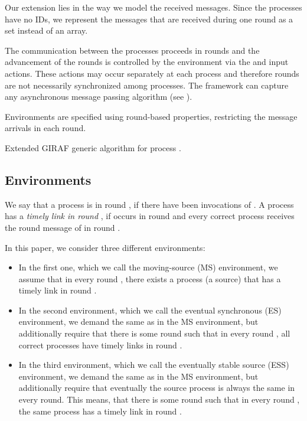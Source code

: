 \documentclass[conference, compsoc]{IEEEtran}
\begin{document}
Our extension lies in the way we model the received messages. Since the processes have no IDs, we represent the messages that are received during one round as a set instead of an array.

The communication between the processes proceeds in rounds and the advancement of the rounds is controlled by the environment via the  and  input actions. These actions may occur separately at each process  and therefore rounds are not necessarily synchronized among processes. The framework can capture any asynchronous message passing algorithm (see \cite{1449454}). 

Environments are specified using round-based properties, restricting the message arrivals in each round. 

\begin{algorithm}[htb] 
  {\small \SetVline   
	       
		

\caption{Extended GIRAF generic algorithm for process .}
\label{alg:eGIRAF}
}
\end{algorithm} 


\subsection{Environments}

We say that a process  is in round , if there have been  invocations of . A process  has a \emph{timely link in round }, if  occurs in round  and every correct process  receives the round  message of  in round . 

In this paper, we consider three different environments: 
\begin{itemize}
 \item In the first one, which we call the moving-source (MS) environment, we assume that in every round , there exists a process  (a source) that has a timely link in round .

 \item In the second environment, which we call the eventual synchronous (ES) environment, we demand the same as in the MS environment, but additionally require that there is some round  such that in every round , all correct processes have timely links in round .
  
 \item In the third environment, which we call the eventually stable source (ESS) environment, we demand the same as in the MS environment, but additionally require that eventually the source process  is always the same in every round. This means, that there is some round  such that in every round , the same process  has a timely link in round .
\end{itemize}
\end{document}
